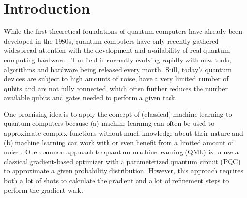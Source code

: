 \chapter{Introduction}
\label{chap:intro}


While the first theoretical foundations of quantum computers have already been
developed in the 1980s, quantum computers have only recently gathered widespread
attention with the development and availability of real quantum computing
hardware \cite{nielsen_quantum_2007,hidary_quantum_2021}.
The field is currently evolving rapidly with new tools, algorithms and hardware
being released every month. %
Still, today's quantum devices are subject to high amounts of noise, have a very
limited number of qubits and are not fully connected, which often further
reduces the number available qubits and gates needed to perform a given task.

One promising idea is to apply the concept of (classical) machine learning to
quantum computers because (a) machine learning can often be used to approximate
complex functions without much knowledge about their nature and
(b) machine learning can work with or even benefit from a limited amount of
noise \cite{ciliberto_quantum_2018}.
One common approach to quantum machine learning (QML) is to use a classical
gradient-based optimizer with a parameterized quantum circuit (PQC) to
approximate a given probability distribution.
However, this approach requires both a lot of shots to calculate the gradient
and a lot of refinement steps to perform the gradient walk.

